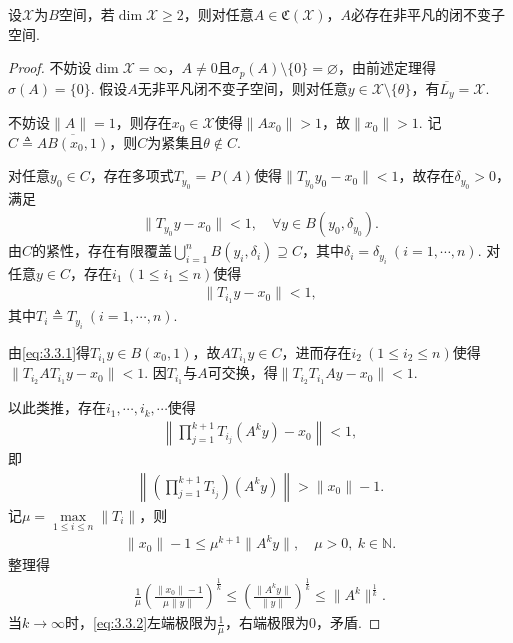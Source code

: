\documentclass[../../main.tex]{subfiles}%
\begin{document}
\begin{theorem}
设$\mathscr{X}$为$B$空间，若$\dim\mathscr{X}\geqslant2$，则对任意$A\in\mathfrak{C}(\mathscr{X})$，$A$必存在非平凡的闭不变子空间.
\end{theorem}
\begin{proof}
不妨设$\dim\mathscr{X}=\infty$，$A\neq0$且$\sigma_p(A)\setminus\{0\}=\varnothing $，由前述定理得$\sigma(A)=\{0\}$.
假设$A$无非平凡闭不变子空间，则对任意$y\in\mathscr{X}\setminus\{\theta\}$，有$\overline{L_y}=\mathscr{X}$.

不妨设$\|A\|=1$，则存在$x_0\in\mathscr{X}$使得$\|Ax_0\|>1$，故$\|x_0\|>1$.
记$C\triangleq\overline{AB(x_0,1)}$，则$C$为紧集且$\theta\notin C$.

对任意$y_0\in C$，存在多项式$T_{y_0}=P(A)$使得$\|T_{y_0}y_0-x_0\|<1$，故存在$\delta_{y_0}>0$，满足
\begin{align*}
\|T_{y_0}y-x_0\|<1,\quad \forall y\in B(y_0,\delta_{y_0}).
\end{align*}
由$C$的紧性，存在有限覆盖$\bigcup\limits_{i=1}^n B(y_i,\delta_i)\supseteq C$，其中$\delta_i=\delta_{y_i}\ (i=1,\cdots,n)$.
对任意$y\in C$，存在$i_1\ (1\leqslant i_1\leqslant n)$使得
\begin{align}\label{eq:3.3.1}
\|T_{i_1}y-x_0\|<1,
\end{align}
其中$T_i\triangleq T_{y_i}\ (i=1,\cdots,n)$.

由\eqref{eq:3.3.1}得$T_{i_1}y\in B(x_0,1)$，故$AT_{i_1}y\in C$，进而存在$i_2\ (1\leqslant i_2\leqslant n)$使得$\|T_{i_2}AT_{i_1}y-x_0\|<1$.
因$T_{i_1}$与$A$可交换，得$\|T_{i_2}T_{i_1}Ay-x_0\|<1$.

以此类推，存在$i_1,\cdots,i_k,\cdots$使得
\begin{align*}
\left\|\prod\limits_{j=1}^{k+1}T_{i_j}(A^k y)-x_0\right\|<1,
\end{align*}
即
\begin{align*}
\left\|\left(\prod\limits_{j=1}^{k+1}T_{i_j}\right)(A^k y)\right\|>\|x_0\|-1.
\end{align*}
记$\mu=\max\limits_{1\leqslant i\leqslant n}\|T_i\|$，则
\begin{align*}
\|x_0\|-1\leqslant\mu^{k+1}\|A^k y\|,\quad \mu>0,\ k\in\mathbb{N}.
\end{align*}
整理得
\begin{align}\label{eq:3.3.2}
\frac1\mu\left(\frac{\|x_0\|-1}{\mu\|y\|}\right)^{\frac1k}\leqslant\left(\frac{\|A^k y\|}{\|y\|}\right)^{\frac1k}\leqslant\|A^k\|^{\frac1k}.
\end{align}
当$k\to\infty$时，\eqref{eq:3.3.2}左端极限为$\frac1\mu$，右端极限为$0$，矛盾.
\end{proof}
\end{document}
